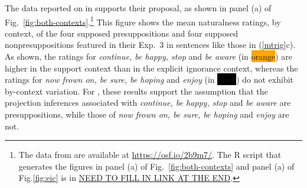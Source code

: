\documentclass[11pt,fleqn]{article}
\newcommand{\6}{\mbox{$[\hspace*{-.6mm}[$}}
\newcommand{\9}{\mbox{$]\hspace*{-.6mm}]$}}
\begin{document}
The data reported on in \citealt[Exp.~3]{mandelkern-etal2020} supports their proposal, as shown in panel (a) of Fig.~\ref{fig:both-contexts}.\footnote{The data from \citealt[Exp.~3]{mandelkern-etal2020} are available at \url{https://osf.io/2b9m7/}. The R script that generates the figures in panel (a) of Fig.~\ref{fig:both-contexts} and panel (a) of Fig.\ref{fig:eic} is in \url{NEED TO FILL IN LINK AT THE END}.} This figure shows the mean naturalness ratings, by context, of the four supposed presuppositions and four supposed nonpresuppositions featured in their Exp.~3 in sentences like those in (\ref{mtrig}c). As shown, the ratings for \emph{continue, be happy, stop} and \emph{be aware} (in \colorbox{orange}{\color{white}orange\color{black}}) are higher in the support context than in the explicit ignorance context, whereas the ratings for \emph{now frown on, be sure, be hoping} and \emph{enjoy} (in \colorbox{black}{\color{white}black\color{black}}) do not exhibit by-context variation. For \citealt{mandelkern-etal2020}, these results support the assumption that the projection inferences associated with \emph{continue, be happy, stop} and \emph{be aware} are presuppositions, while those of \emph{now frown on, be sure, be hoping} and \emph{enjoy} are not.
\end{document}
